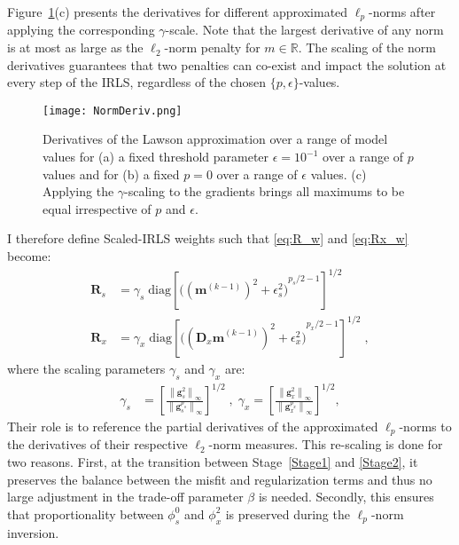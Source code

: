 Figure~\ref{NormDeriv}(c) presents the derivatives for different approximated $\ell_p$-norms after applying the corresponding $\gamma$-scale. Note that the largest derivative of any norm is at most as large as the $\ell_2$-norm penalty for $m \in \mathbb{R}$.
The scaling of the norm derivatives guarantees that two penalties can co-exist and impact the solution at every step of the IRLS, regardless of the chosen $\{p,\epsilon\}$-values.
\begin{figure}
\texttt{[image: NormDeriv.png]}
\caption{Derivatives of the Lawson approximation over a range of model values for (a) a fixed threshold parameter $\epsilon=10^{-1}$ over a range of $p$ values and for (b) a fixed $p=0$ over a range of $\epsilon$ values. (c) Applying the $\gamma$-scaling to the gradients brings all maximums to be equal irrespective of $p$ and $\epsilon$.}
\label{NormDeriv}
\end{figure}

I therefore define Scaled-IRLS weights such that \eqref{eq:R_w} and \eqref{eq:Rx_w} become:
\begin{equation}\label{etaScale}
\begin{split}
\mathbf{R}_s &= \gamma_s\; \text{diag} \left[{\Big( {({\mathbf{m}}^{(k-1)})}^{2} + \epsilon_s^2 \Big)}^{p_s/2 - 1} \right]^{1/2} \\
\mathbf{R}_x &= \gamma_x\; \text{diag} \left[{\Big( {({\mathbf{D}_x \mathbf{m}}^{(k-1)})}^{2} + \epsilon_x^2 \Big)}^{p_x/2 - 1} \right]^{1/2} \;,
\end{split}
\end{equation}
where the scaling parameters $\gamma_s$ and $\gamma_x$ are:
\begin{equation}
\begin{split}
\gamma_s &= \left[\frac{ \left\| \mathbf{g}_s^2 \right\|_\infty}{\left\|\mathbf{g}_s^{p_s}\right\|_\infty}\right]^{1/2} \;,\; \gamma_x = \left[ \frac{ \left\|\mathbf{g}_x^2\right\|_\infty}{\left\|\mathbf{g}_x^{p_x}\right\|_\infty}\right]^{1/2},
\end{split}
\end{equation}
Their role is to reference the partial derivatives of the approximated $\ell_p$-norms to the derivatives of their respective $\ell_2$-norm measures. This re-scaling is done for two reasons. First, at the transition between Stage~\ref{Stage1} and \ref{Stage2}, it preserves the balance between the misfit and regularization terms and thus no large adjustment in the trade-off parameter $\beta$ is needed. Secondly, this ensures that proportionality between $\phi^0_s $ and $\phi^2_x$ is preserved during the $\ell_p$-norm inversion.

